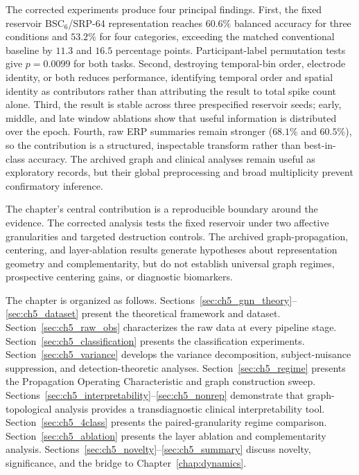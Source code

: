 The corrected experiments produce four principal findings. First, the fixed reservoir BSC$_6$/SRP-64 representation reaches $60.6\%$ balanced accuracy for three conditions and $53.2\%$ for four categories, exceeding the matched conventional baseline by $11.3$ and $16.5$ percentage points. Participant-label permutation tests give $p=0.0099$ for both tasks. Second, destroying temporal-bin order, electrode identity, or both reduces performance, identifying temporal order and spatial identity as contributors rather than attributing the result to total spike count alone. Third, the result is stable across three prespecified reservoir seeds; early, middle, and late window ablations show that useful information is distributed over the epoch. Fourth, raw ERP summaries remain stronger ($68.1\%$ and $60.5\%$), so the contribution is a structured, inspectable transform rather than best-in-class accuracy. The archived graph and clinical analyses remain useful as exploratory records, but their global preprocessing and broad multiplicity prevent confirmatory inference.

The chapter's central contribution is a reproducible boundary around the evidence. The corrected analysis tests the fixed reservoir under two affective granularities and targeted destruction controls. The archived graph-propagation, centering, and layer-ablation results generate hypotheses about representation geometry and complementarity, but do not establish universal graph regimes, prospective centering gains, or diagnostic biomarkers.

The chapter is organized as follows. Sections~\ref{sec:ch5_gnn_theory}--\ref{sec:ch5_dataset} present the theoretical framework and dataset. Section~\ref{sec:ch5_raw_obs} characterizes the raw data at every pipeline stage. Section~\ref{sec:ch5_classification} presents the classification experiments. Section~\ref{sec:ch5_variance} develops the variance decomposition, subject-nuisance suppression, and detection-theoretic analyses. Section~\ref{sec:ch5_regime} presents the Propagation Operating Characteristic and graph construction sweep. Sections~\ref{sec:ch5_interpretability}--\ref{sec:ch5_nonrep} demonstrate that graph-topological analysis provides a transdiagnostic clinical interpretability tool. Section~\ref{sec:ch5_4class} presents the paired-granularity regime comparison. Section~\ref{sec:ch5_ablation} presents the layer ablation and complementarity analysis. Sections~\ref{sec:ch5_novelty}--\ref{sec:ch5_summary} discuss novelty, significance, and the bridge to Chapter~\ref{chap:dynamics}.


